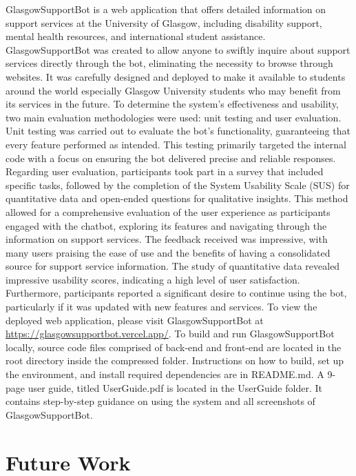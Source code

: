 \documentclass{l4proj}
\begin{document}
GlasgowSupportBot is a web application that offers detailed information on support services at the University of Glasgow, including disability support, mental health resources, and international student assistance. GlasgowSupportBot was created to allow anyone to swiftly inquire about support services directly through the bot, eliminating the necessity to browse through websites. It was carefully designed and deployed to make it available to students around the world especially Glasgow University students who may benefit from its services in the future. To determine the system's effectiveness and usability, two main evaluation methodologies were used: unit testing and user evaluation. Unit testing was carried out to evaluate the bot's functionality, guaranteeing that every feature performed as intended. This testing primarily targeted the internal code with a focus on ensuring the bot delivered precise and reliable responses. Regarding user evaluation, participants took part in a survey that included specific tasks, followed by the completion of the System Usability Scale (SUS) for quantitative data and open-ended questions for qualitative insights. This method allowed for a comprehensive evaluation of the user experience as participants engaged with the chatbot, exploring its features and navigating through the information on support services. The feedback received was impressive, with many users praising the ease of use and the benefits of having a consolidated source for support service information. The study of quantitative data revealed impressive usability scores, indicating a high level of user satisfaction. Furthermore, participants reported a significant desire to continue using the bot, particularly if it was updated with new features and services. To view the deployed web application, please visit GlasgowSupportBot at \url{https://glasgowsupportbot.vercel.app/}. To build and run GlasgowSupportBot locally, source code files comprised of back-end and front-end are located in the root directory inside the compressed folder. Instructions on how to build, set up the environment, and install
required dependencies are in README.md. A 9-page user guide, titled UserGuide.pdf is located in the UserGuide folder. It contains step-by-step guidance on using the system
and all screenshots of GlasgowSupportBot.

\section{Future Work}
\end{document}
